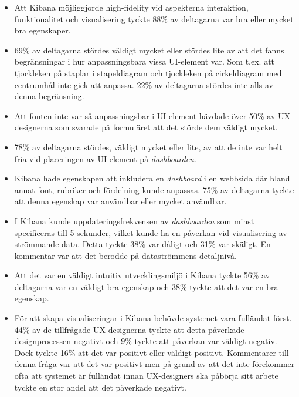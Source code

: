 \documentclass[12pt]{kththesis}
\begin{document}
\begin{itemize}
\item Att Kibana möjliggjorde high-fidelity vid aspekterna interaktion, funktionalitet och visualisering tyckte 88\% av deltagarna var bra eller mycket bra egenskaper.

\item 69\% av deltagarna stördes väldigt mycket eller stördes lite av att det fanns begränsningar i hur anpassningsbara vissa UI-element var. Som t.ex. att tjockleken på staplar i stapeldiagram och tjockleken på cirkeldiagram med centrumhål inte gick att anpassa. 22\% av deltagarna stördes inte alls av denna begränsning.

\item Att fonten inte var så anpassningsbar i UI-element hävdade över 50\% av UX-designerna som svarade på formuläret att det störde dem väldigt mycket.

\item 78\% av deltagarna stördes, väldigt mycket eller lite, av att de inte var helt fria vid placeringen av UI-element på \textit{dashboarden}. 

\item Kibana hade egenskapen att inkludera en \textit{dashboard} i en webbsida där bland annat font, rubriker och fördelning kunde anpassas. 75\% av deltagarna tyckte att denna egenskap var användbar eller mycket användbar.

\item I Kibana kunde uppdateringsfrekvensen av \textit{dashboarden} som minst specificeras till 5 sekunder, vilket kunde ha en påverkan vid visualisering av strömmande data. Detta tyckte 38\% var dåligt och 31\% var skäligt. En kommentar var att det berodde på dataströmmens detaljnivå.

\item Att det var en väldigt intuitiv utvecklingsmiljö i Kibana tyckte 56\% av deltagarna var en väldigt bra egenskap och 38\% tyckte att det var en bra egenskap.

\item För att skapa visualiseringar i Kibana behövde systemet vara fulländat först. 44\% av de tillfrågade UX-designerna tyckte att detta påverkade designprocessen negativt och 9\% tyckte att påverkan var väldigt negativ. Dock tyckte 16\% att det var positivt eller väldigt positivt. Kommentarer till denna fråga var att det var positivt men på grund av att det inte förekommer ofta att systemet är fulländat innan UX-designers ska påbörja sitt arbete tyckte en stor andel att det påverkade negativt.


\end{itemize}
\end{document}
